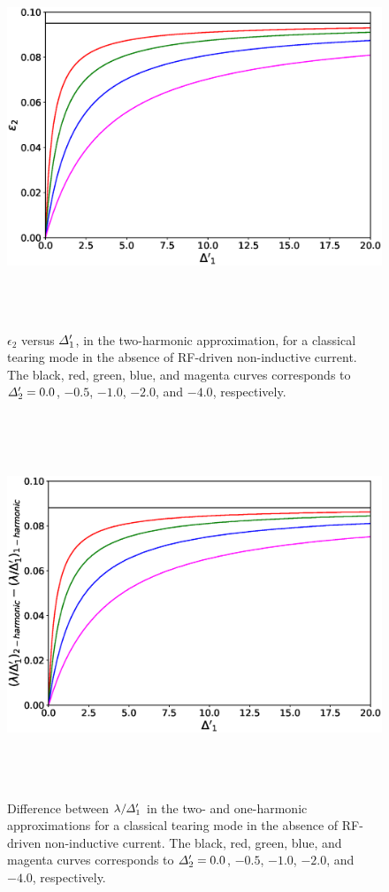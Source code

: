 \documentclass[12pt,prb,aps]{revtex4-1}
\begin{document}
\begin{figure}
\centerline{\includegraphics[height=4.5in]{Figure5.eps}}
\caption{$\epsilon_2$ versus ${\mit\Delta}_1'$, in the two-harmonic approximation, for a classical
tearing mode in the absence of RF-driven non-inductive current. The black, red,
green, blue, and magenta curves corresponds  to ${\mit\Delta}_2'=0.0$, $-0.5$,
$-1.0$, $-2.0$, and $-4.0$, respectively. }\label{fig5}
\end{figure}

\begin{figure}
\centerline{\includegraphics[height=4.5in]{Figure6.eps}}
\caption{Difference between $\lambda/{\mit\Delta}_1'$ in the two- and one-harmonic approximations for a classical
tearing mode in the absence of RF-driven non-inductive current. The black, red,
green, blue, and magenta curves corresponds  to ${\mit\Delta}_2'=0.0$, $-0.5$,
$-1.0$, $-2.0$, and $-4.0$, respectively. }\label{fig6}
\end{figure}
\end{document}
